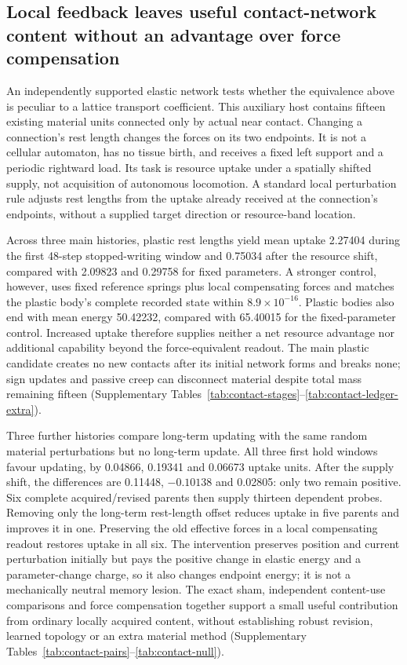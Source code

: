 \subsection*{Local feedback leaves useful contact-network content without an advantage over force compensation}

An independently supported elastic network tests whether the equivalence above is peculiar to a lattice transport coefficient. This auxiliary host contains fifteen existing material units connected only by actual near contact. Changing a connection's rest length changes the forces on its two endpoints. It is not a cellular automaton, has no tissue birth, and receives a fixed left support and a periodic rightward load. Its task is resource uptake under a spatially shifted supply, not acquisition of autonomous locomotion. A standard local perturbation rule adjusts rest lengths from the uptake already received at the connection's endpoints, without a supplied target direction or resource-band location.

Across three main histories, plastic rest lengths yield mean uptake 2.27404 during the first 48-step stopped-writing window and 0.75034 after the resource shift, compared with 2.09823 and 0.29758 for fixed parameters. A stronger control, however, uses fixed reference springs plus local compensating forces and matches the plastic body's complete recorded state within $8.9\times10^{-16}$. Plastic bodies also end with mean energy 50.42232, compared with 65.40015 for the fixed-parameter control. Increased uptake therefore supplies neither a net resource advantage nor additional capability beyond the force-equivalent readout. The main plastic candidate creates no new contacts after its initial network forms and breaks none; sign updates and passive creep can disconnect material despite total mass remaining fifteen (Supplementary Tables~\ref{tab:contact-stages}--\ref{tab:contact-ledger-extra}).

Three further histories compare long-term updating with the same random material perturbations but no long-term update. All three first hold windows favour updating, by 0.04866, 0.19341 and 0.06673 uptake units. After the supply shift, the differences are 0.11448, $-0.10138$ and 0.02805: only two remain positive. Six complete acquired/revised parents then supply thirteen dependent probes. Removing only the long-term rest-length offset reduces uptake in five parents and improves it in one. Preserving the old effective forces in a local compensating readout restores uptake in all six. The intervention preserves position and current perturbation initially but pays the positive change in elastic energy and a parameter-change charge, so it also changes endpoint energy; it is not a mechanically neutral memory lesion. The exact sham, independent content-use comparisons and force compensation together support a small useful contribution from ordinary locally acquired content, without establishing robust revision, learned topology or an extra material method (Supplementary Tables~\ref{tab:contact-pairs}--\ref{tab:contact-null}).


